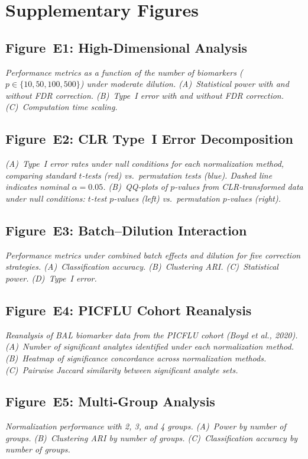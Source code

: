 \documentclass[12pt]{article}
\begin{document}
\section{Supplementary Figures}

\subsection*{Figure~E1: High-Dimensional Analysis}
\textit{Performance metrics as a function of the number of biomarkers ($p \in \{10, 50, 100, 500\}$) under moderate dilution. (A)~Statistical power with and without FDR correction. (B)~Type~I error with and without FDR correction. (C)~Computation time scaling.}

\subsection*{Figure~E2: CLR Type~I Error Decomposition}
\textit{(A)~Type~I error rates under null conditions for each normalization method, comparing standard $t$-tests (red) vs.\ permutation tests (blue). Dashed line indicates nominal $\alpha = 0.05$. (B)~QQ-plots of $p$-values from CLR-transformed data under null conditions: $t$-test $p$-values (left) vs.\ permutation $p$-values (right).}

\subsection*{Figure~E3: Batch--Dilution Interaction}
\textit{Performance metrics under combined batch effects and dilution for five correction strategies. (A)~Classification accuracy. (B)~Clustering ARI. (C)~Statistical power. (D)~Type~I error.}

\subsection*{Figure~E4: PICFLU Cohort Reanalysis}
\textit{Reanalysis of BAL biomarker data from the PICFLU cohort (Boyd et al., 2020). (A)~Number of significant analytes identified under each normalization method. (B)~Heatmap of significance concordance across normalization methods. (C)~Pairwise Jaccard similarity between significant analyte sets.}

\subsection*{Figure~E5: Multi-Group Analysis}
\textit{Normalization performance with 2, 3, and 4 groups. (A)~Power by number of groups. (B)~Clustering ARI by number of groups. (C)~Classification accuracy by number of groups.}
\end{document}
